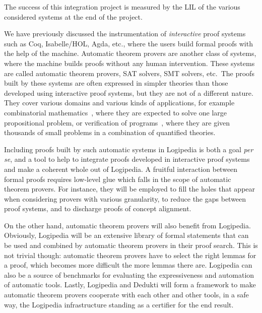 The success of this integration project is measured by the LIL of the various
considered systems at the end of the project.


We have previously discussed the instrumentation of \emph{interactive}
proof systems such as Coq, Isabelle/HOL, Agda, etc.,
where the users build formal proofs with the help of the
machine. Automatic theorem provers are another class of systems, where
the machine builds proofs without any human intervention.
These systems are called automatic theorem provers, SAT solvers, SMT
solvers, etc.\ The proofs
built by these systems are often expressed in simpler theories than
those developed using interactive proof systems, but they are not of a different
nature.  They cover various domains and various kinds of applications,
for example combinatorial
mathematics~\cite{DBLP:journals/ai/KonevL15,DBLP:conf/sat/HeuleKM16},
where they are expected to solve one large propositional problem, or
verification of
programs~\cite{DBLP:conf/esop/FilliatreP13,DBLP:journals/pacmpl/ProtzenkoZRRWBD17},
where they are given thousands of small problems in a combination of
quantified theories.

Including proofs built by such automatic systems in Logipedia
is both a goal {\em per se}, and a tool to help to
integrate proofs developed in interactive proof systems and make a coherent whole out
of Logipedia. A fruitful interaction between formal proofs requires
low-level glue which falls in the scope of automatic theorem provers.
For instance, they will be employed to fill the holes that appear when
considering provers with various granularity, to reduce the gaps
between proof systems, and to discharge proofs of concept alignment.

On the other hand, automatic theorem provers will also benefit from
Logipedia. Obviously, Logipedia will be an extensive library of formal
statements that can be used and combined by automatic theorem provers in their
proof search. This is not trivial though: automatic theorem provers have to
select the right lemmas for a proof, which becomes more difficult the more
lemmas there are.  Logipedia can also be a source of benchmarks for evaluating the
expressiveness and automation of automatic tools.  Lastly, Logipedia and Dedukti
will form a framework to make automatic theorem provers cooperate with each
other and other tools, in a safe way, the Logipedia infrastructure standing as a certifier for the end result.

